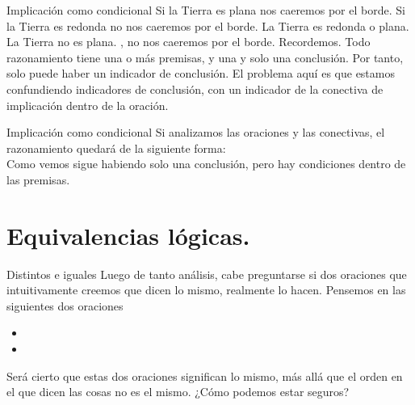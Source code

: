 \begin{frame}{Implicación como condicional}
  Si la Tierra es plana  nos caeremos por el borde. Si la
  Tierra es redonda  no nos caeremos por el borde. La Tierra es
  redonda o plana. La Tierra no es plana. , no nos caeremos
  por el borde.
  \jump
  Recordemos. Todo razonamiento tiene una o más premisas, y una y solo una
  conclusión. Por tanto, solo puede haber un indicador de conclusión.
  \jump
  El problema aquí es que estamos confundiendo indicadores de conclusión, con un
  indicador de la conectiva de implicación dentro de la oración.
\end{frame}


\begin{frame}{Implicación como condicional}
  Si analizamos las oraciones y las conectivas, el razonamiento quedará de la
  siguiente forma:\\
  \jump
  \jump
  Como vemos sigue habiendo solo una conclusión, pero hay condiciones dentro
  de las premisas.
\end{frame}


\section{Equivalencias lógicas.}


\begin{frame}{Distintos e iguales}
  Luego de tanto análisis, cabe preguntarse si dos oraciones que intuitivamente
  creemos que dicen lo mismo, realmente lo hacen.
  \jump
  Pensemos en las siguientes dos oraciones
  \begin{itemize}
    \item {}
    \item {}
  \end{itemize}
  \jump
  Será cierto que estas dos oraciones significan lo mismo, más allá que el orden
  en el que dicen las cosas no es el mismo. ¿Cómo podemos estar seguros?
\end{frame}


